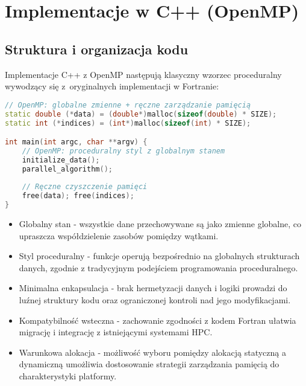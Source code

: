 \section{Implementacje w C++ (OpenMP)}
\subsection{Struktura i organizacja kodu}
Implementacje C++ z OpenMP następują klasyczny wzorzec proceduralny wywodzący się z~oryginalnych implementacji w Fortranie:

\begin{lstlisting}[language=C++, style=VS2017,  style=VS2017, caption={Struktura kodu benchmarków w języku C++ z OpenMP}, label={lst:openmp_structure}]
// OpenMP: globalne zmienne + ręczne zarządzanie pamięcią
static double (*data) = (double*)malloc(sizeof(double) * SIZE);
static int (*indices) = (int*)malloc(sizeof(int) * SIZE);

int main(int argc, char **argv) {
    // OpenMP: proceduralny styl z globalnym stanem
    initialize_data();
    parallel_algorithm();
    
    // Ręczne czyszczenie pamięci
    free(data); free(indices);
}
\end{lstlisting}
\begin{itemize}
    \item Globalny stan - wszystkie dane przechowywane są jako zmienne globalne, co upraszcza współdzielenie zasobów pomiędzy wątkami.
    
    \item Styl proceduralny - funkcje operują bezpośrednio na globalnych strukturach danych, zgodnie z tradycyjnym podejściem programowania proceduralnego.
    
    \item Minimalna enkapsulacja - brak hermetyzacji danych i logiki prowadzi do luźnej struktury kodu oraz ograniczonej kontroli nad jego modyfikacjami.
    
    \item Kompatybilność wsteczna - zachowanie zgodności z kodem Fortran ułatwia migrację i integrację z istniejącymi systemami HPC.
    
    \item Warunkowa alokacja - możliwość wyboru pomiędzy alokacją statyczną a dynamiczną umożliwia dostosowanie strategii zarządzania pamięcią do charakterystyki platformy.
\end{itemize}
  
